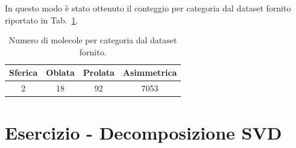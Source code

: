 \documentclass[a4paper]{article}
\newcounter{count_es}
\newcounter{count_sub_es}[count_es]
\renewcommand{\tablename}{Tab.}
\begin{document}
In questo modo è stato ottenuto il conteggio per categoria dal dataset fornito riportato in \tablename~\ref{tab:es_1c}.
\begin{table}[H]
    \centering
    \setlength{\tabcolsep}{10pt}  %
    \renewcommand{\arraystretch}{1.25} %
    \begin{tabular}{ c | c | c | c}
        \textbf{Sferica} & \textbf{Oblata} & \textbf{Prolata} & \textbf{Asimmetrica}\\
        \hline
         2 & 18 & 92 & 7053  \\
    \end{tabular}
    \caption{Numero di molecole per categoria dal dataset fornito.\label{tab:es_1c}}
\end{table}

\section*{Esercizio  - Decomposizione SVD}
\end{document}
